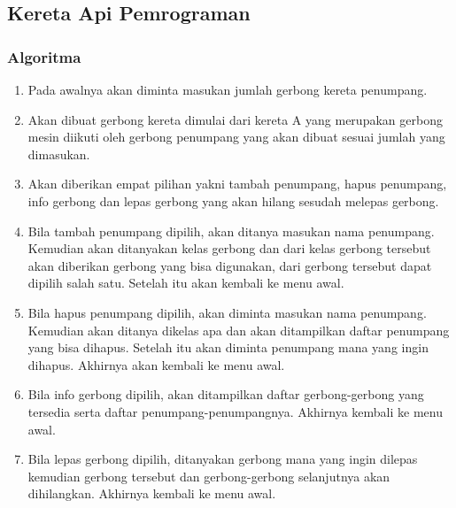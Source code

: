 \documentclass[../main.tex]{subfiles}
\begin{document}
    \subsection{Kereta Api Pemrograman}
    \subsubsection{Algoritma}
    {\renewcommand{\labelenumi}{\alph{enumi}.}
        \begin{enumerate}[leftmargin=1.56cm]
            \item {Pada awalnya akan diminta masukan jumlah gerbong kereta penumpang. }
            \item {Akan dibuat gerbong kereta dimulai dari kereta A yang merupakan gerbong mesin diikuti oleh gerbong penumpang yang akan dibuat sesuai jumlah yang dimasukan.}
            \item {Akan diberikan empat pilihan yakni tambah penumpang, hapus penumpang, info gerbong dan lepas gerbong yang akan hilang sesudah melepas gerbong.}
            \item {Bila tambah penumpang dipilih, akan ditanya masukan nama penumpang. Kemudian akan ditanyakan kelas gerbong dan dari kelas gerbong tersebut akan diberikan gerbong yang bisa digunakan, dari gerbong tersebut dapat dipilih salah satu. Setelah itu akan kembali ke menu awal.}
            \item {Bila hapus penumpang dipilih, akan diminta masukan nama penumpang. Kemudian akan ditanya dikelas apa dan akan ditampilkan daftar penumpang yang bisa dihapus. Setelah itu akan diminta penumpang mana yang ingin dihapus. Akhirnya akan kembali ke menu awal.}
            \item {Bila info gerbong dipilih, akan ditampilkan daftar gerbong-gerbong yang tersedia serta daftar penumpang-penumpangnya. Akhirnya kembali ke menu awal.}
            \item {Bila lepas gerbong dipilih, ditanyakan gerbong mana yang ingin dilepas kemudian gerbong tersebut dan gerbong-gerbong selanjutnya akan dihilangkan. Akhirnya kembali ke menu awal.}
        \end{enumerate}
    }

    \subsubsection{\Flowchart}
\end{document}
